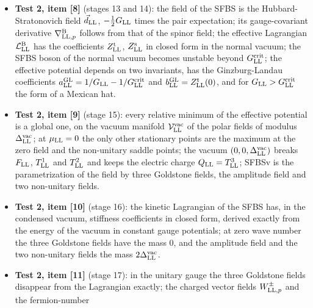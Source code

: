 \documentclass[
  10pt,
]{article}
\begin{document}
\begin{itemize}
  point form 28 pairs; six of them have spin zero, and by the Pauli
  principle these are isospin triplets (three scalar and three
  pseudoscalar pairs); the interaction and parity select the scalar
  channel; the superfluid boson singlet state (SFBS) is a coherent state
  of pairs of particles and of antiparticles, and it is the ground state
  of the mean-field Hamiltonian.
\item
  \textbf{Test 2, item {[}8{]}} (stages 13 and 14): the field of the
  SFBS is the Hubbard-Stratonovich field \(\vec d_{\rm LL}\),
  \(-\tfrac12G_{\rm LL}\) times the pair expectation; its
  gauge-covariant derivative \(\nabla^{\rm B}_{{\rm LL},p}\) follows
  from that of the spinor field; the effective Lagrangian
  \(\mathcal L^{\rm B}_{\rm LL}\) has the coefficients
  \(Z^{\rm t}_{\rm LL}\), \(Z^{\rm s}_{\rm LL}\) in closed form in the
  normal vacuum; the SFBS boson of the normal vacuum becomes unstable
  beyond \(G^{\rm crit}_{\rm LL}\); the effective potential depends on
  two invariants, has the Ginzburg-Landau coefficients
  \(a^{\rm GL}_{\rm LL}=1/G_{\rm LL}-1/G^{\rm crit}_{\rm LL}\) and
  \(b^{\rm GL}_{\rm LL}=Z^{\rm t}_{\rm LL}(0)\), and for
  \(G_{\rm LL}>G^{\rm crit}_{\rm LL}\) the form of a Mexican hat.
\item
  \textbf{Test 2, item {[}9{]}} (stage 15): every relative minimum of
  the effective potential is a global one, on the vacuum manifold
  \(\mathcal V^{\rm vac}_{\rm LL}\) of the polar fields of modulus
  \(\Delta^{\rm vac}_{\rm LL}\); at \(\mu_{\rm LL}=0\) the only other
  stationary points are the maximum at the zero field and the
  non-unitary saddle points; the vacuum
  \((0,0,\Delta^{\rm vac}_{\rm LL})\) breaks \(F_{\rm LL}\),
  \(T^1_{\rm LL}\) and \(T^2_{\rm LL}\) and keeps the electric charge
  \(Q_{\rm LL}=T^3_{\rm LL}\); SFBSv is the parametrization of the field
  by three Goldstone fields, the amplitude field and two non-unitary
  fields.
\item
  \textbf{Test 2, item {[}10{]}} (stage 16): the kinetic Lagrangian of
  the SFBS has, in the condensed vacuum, stiffness coefficients in
  closed form, derived exactly from the energy of the vacuum in constant
  gauge potentials; at zero wave number the three Goldstone fields have
  the mass 0, and the amplitude field and the two non-unitary fields the
  mass \(2\Delta^{\rm vac}_{\rm LL}\).
\item
  \textbf{Test 2, item {[}11{]}} (stage 17): in the unitary gauge the
  three Goldstone fields disappear from the Lagrangian exactly; the
  charged vector fields \(W^\pm_{{\rm LL},p}\) and the fermion-number

\end{itemize}
\end{document}

